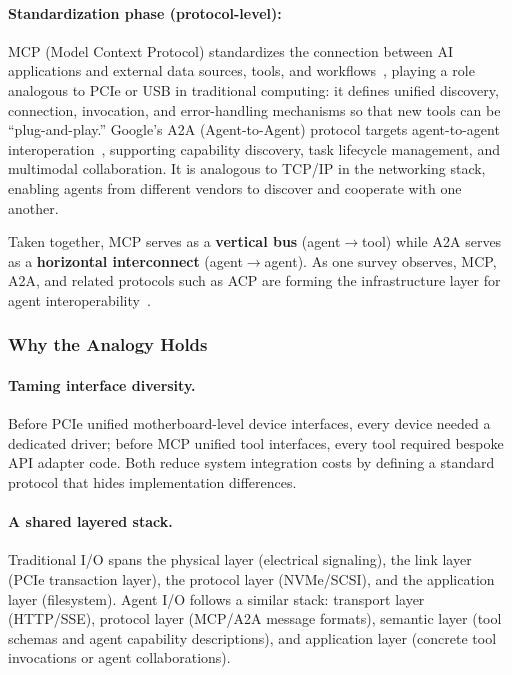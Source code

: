 \paragraph{Standardization phase (protocol-level):}
MCP (Model Context Protocol) standardizes the connection between AI applications and external data sources, tools, and workflows~\cite{mcp_intro_2026}, playing a role analogous to PCIe or USB in traditional computing: it defines unified discovery, connection, invocation, and error-handling mechanisms so that new tools can be ``plug-and-play.''
Google's A2A (Agent-to-Agent) protocol targets agent-to-agent interoperation~\cite{google_a2a_2025}, supporting capability discovery, task lifecycle management, and multimodal collaboration. It is analogous to TCP/IP in the networking stack, enabling agents from different vendors to discover and cooperate with one another.

Taken together, MCP serves as a \textbf{vertical bus} (agent$\to$tool) while A2A serves as a \textbf{horizontal interconnect} (agent$\to$agent).
As one survey observes, MCP, A2A, and related protocols such as ACP are forming the infrastructure layer for agent interoperability~\cite{agentprotocols2025}.

\subsubsection{Why the Analogy Holds}

\paragraph{Taming interface diversity.}
Before PCIe unified motherboard-level device interfaces, every device needed a dedicated driver; before MCP unified tool interfaces, every tool required bespoke API adapter code.
Both reduce system integration costs by defining a standard protocol that hides implementation differences.

\paragraph{A shared layered stack.}
Traditional I/O spans the physical layer (electrical signaling), the link layer (PCIe transaction layer), the protocol layer (NVMe/SCSI), and the application layer (filesystem).
Agent I/O follows a similar stack: transport layer (HTTP/SSE), protocol layer (MCP/A2A message formats), semantic layer (tool schemas and agent capability descriptions), and application layer (concrete tool invocations or agent collaborations).

